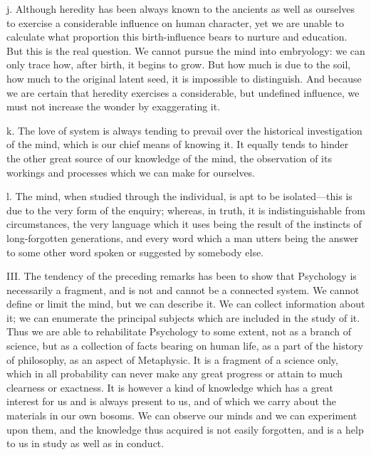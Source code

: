 \documentclass[11pt,letter]{article}
\begin{document}
\par  j. Although heredity has been always known to the ancients as well as ourselves to exercise a considerable influence on human character, yet we are unable to calculate what proportion this birth-influence bears to nurture and education. But this is the real question. We cannot pursue the mind into embryology: we can only trace how, after birth, it begins to grow. But how much is due to the soil, how much to the original latent seed, it is impossible to distinguish. And because we are certain that heredity exercises a considerable, but undefined influence, we must not increase the wonder by exaggerating it.

\par  k. The love of system is always tending to prevail over the historical investigation of the mind, which is our chief means of knowing it. It equally tends to hinder the other great source of our knowledge of the mind, the observation of its workings and processes which we can make for ourselves.

\par  l. The mind, when studied through the individual, is apt to be isolated—this is due to the very form of the enquiry; whereas, in truth, it is indistinguishable from circumstances, the very language which it uses being the result of the instincts of long-forgotten generations, and every word which a man utters being the answer to some other word spoken or suggested by somebody else.

\par  III. The tendency of the preceding remarks has been to show that Psychology is necessarily a fragment, and is not and cannot be a connected system. We cannot define or limit the mind, but we can describe it. We can collect information about it; we can enumerate the principal subjects which are included in the study of it. Thus we are able to rehabilitate Psychology to some extent, not as a branch of science, but as a collection of facts bearing on human life, as a part of the history of philosophy, as an aspect of Metaphysic. It is a fragment of a science only, which in all probability can never make any great progress or attain to much clearness or exactness. It is however a kind of knowledge which has a great interest for us and is always present to us, and of which we carry about the materials in our own bosoms. We can observe our minds and we can experiment upon them, and the knowledge thus acquired is not easily forgotten, and is a help to us in study as well as in conduct.
\end{document}
